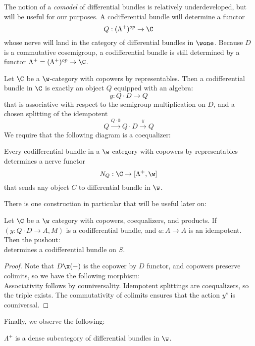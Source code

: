 The notion of a \emph{comodel} of differential bundles is relatively underdeveloped, but will be useful for our purposes.
A codifferential bundle will determine a functor
\[
    Q: (\Lambda^{+})^{op} \to \C
\]
whose nerve will land in the category of differential bundles in $\wone$.
Because $D$ is a commutative cosemigroup, a codifferential bundle is still determined by a functor $\Lambda^+ = (\Lambda^+)^{op} \to \C$.
\begin{definition}
    Let $\C$ be a $\w$-category with copowers by representables.
    Then a codifferential bundle in $\C$ is exactly an object $Q$ equipped with an algebra:
    \[
        y:Q \cdot D \to Q
    \]
    that is associative with respect to the semigroup multiplication on $D$, and a chosen splitting of the idempotent 
    \[
        Q \xrightarrow{Q \cdot 0} Q \cdot D \xrightarrow{y} Q
    \]
    We require that the following diagram is a coequalizer:
    \[\]
\end{definition}
\begin{lemma}
    Every codifferential bundle in a $\w$-category with copowers by representables determines a nerve functor 
    \[
        N_Q: \C \to [\Lambda^+, \w]
    \]
    that sends any object $C$ to differential bundle in $\w$.
\end{lemma}
There is one construction in particular that will be useful later on:
\begin{lemma}
    Let $\C$ be a $\w$ category with copowers, coequalizers, and products.
    If $(y:Q \cdot D \to A, M)$ is a codifferential bundle, and $a:A \to A$ is an idempotent. Then the pushout:
    \[\]
    determines a codifferential bundle on $S$.
\end{lemma}
\begin{proof}
    Note that $D \x (-)$ is the copower by $D$ functor, and copowers preserve colimits, so we have the following morphism:
    \[\]
    Associativity follows by couniversality. Idempotent splittings are coequalizers, so the triple exists.
    The commutativity of colimits ensures that the action $y^s$ is couniversal.
\end{proof}

Finally, we observe the following:
\begin{proposition}
    $\Lambda^+$ is a dense subcategory of differential bundles in $\w$. 
\end{proposition}


